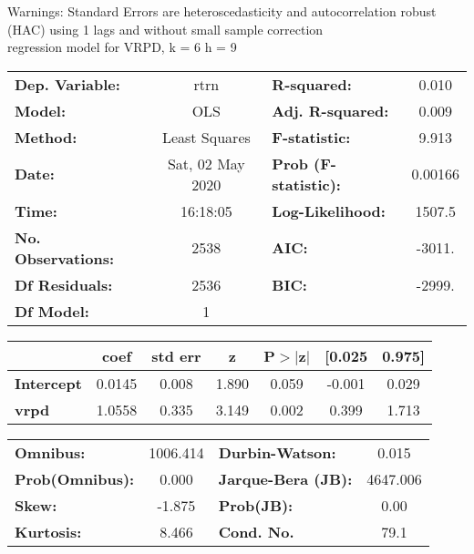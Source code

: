 Warnings: \newline
 [1] Standard Errors are heteroscedasticity and autocorrelation robust (HAC) using 1 lags and without small sample correction\\ 

regression model for VRPD, k = 6 h = 9\begin{center}
\begin{tabular}{lclc}
\toprule
\textbf{Dep. Variable:}    &       rtrn       & \textbf{  R-squared:         } &     0.010   \\
\textbf{Model:}            &       OLS        & \textbf{  Adj. R-squared:    } &     0.009   \\
\textbf{Method:}           &  Least Squares   & \textbf{  F-statistic:       } &     9.913   \\
\textbf{Date:}             & Sat, 02 May 2020 & \textbf{  Prob (F-statistic):} &  0.00166    \\
\textbf{Time:}             &     16:18:05     & \textbf{  Log-Likelihood:    } &    1507.5   \\
\textbf{No. Observations:} &        2538      & \textbf{  AIC:               } &    -3011.   \\
\textbf{Df Residuals:}     &        2536      & \textbf{  BIC:               } &    -2999.   \\
\textbf{Df Model:}         &           1      & \textbf{                     } &             \\
\bottomrule
\end{tabular}
\begin{tabular}{lcccccc}
                   & \textbf{coef} & \textbf{std err} & \textbf{z} & \textbf{P$> |$z$|$} & \textbf{[0.025} & \textbf{0.975]}  \\
\midrule
\textbf{Intercept} &       0.0145  &        0.008     &     1.890  &         0.059        &       -0.001    &        0.029     \\
\textbf{vrpd}      &       1.0558  &        0.335     &     3.149  &         0.002        &        0.399    &        1.713     \\
\bottomrule
\end{tabular}
\begin{tabular}{lclc}
\textbf{Omnibus:}       & 1006.414 & \textbf{  Durbin-Watson:     } &    0.015  \\
\textbf{Prob(Omnibus):} &   0.000  & \textbf{  Jarque-Bera (JB):  } & 4647.006  \\
\textbf{Skew:}          &  -1.875  & \textbf{  Prob(JB):          } &     0.00  \\
\textbf{Kurtosis:}      &   8.466  & \textbf{  Cond. No.          } &     79.1  \\
\bottomrule
\end{tabular}
\end{center}

